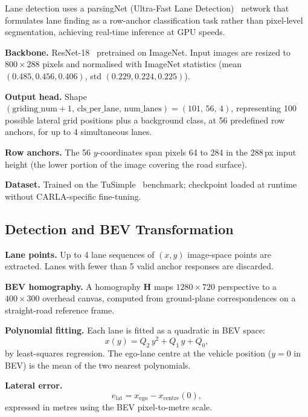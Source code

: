 \documentclass[12pt,a4paper]{article}
\begin{document}
Lane detection uses a parsingNet (Ultra-Fast Lane
Detection)~\cite{qin2020ufld} network that formulates lane finding as a
row-anchor classification task rather than pixel-level segmentation,
achieving real-time inference at GPU speeds.

\textbf{Backbone.}
ResNet-18~\cite{he2016resnet} pretrained on ImageNet.  Input images are
resized to $800\times288$ pixels and normalised with ImageNet statistics
(mean $(0.485,0.456,0.406)$, std $(0.229,0.224,0.225)$).

\textbf{Output head.}
Shape $(\text{griding\_num}+1,\,\text{cls\_per\_lane},\,\text{num\_lanes})
= (101,\,56,\,4)$, representing 100 possible lateral grid positions plus a
background class, at 56 predefined row anchors, for up to 4 simultaneous
lanes.

\textbf{Row anchors.}
The 56 $y$-coordinates span pixels 64 to 284 in the 288\,px input height
(the lower portion of the image covering the road surface).

\textbf{Dataset.}
Trained on the TuSimple~\cite{tusimple2017} benchmark; checkpoint loaded
at runtime without CARLA-specific fine-tuning.

\subsection{Detection and BEV Transformation}
\label{subsec:lane_bev}

\textbf{Lane points.}
Up to 4 lane sequences of $(x,y)$ image-space points are extracted.  Lanes
with fewer than 5 valid anchor responses are discarded.

\textbf{BEV homography.}
A homography $\mathbf{H}$ maps $1280\times720$ perspective to a
$400\times300$ overhead canvas, computed from ground-plane correspondences
on a straight-road reference frame.

\textbf{Polynomial fitting.}
Each lane is fitted as a quadratic in BEV space:
\begin{equation}
  x(y) = Q_2\,y^2 + Q_1\,y + Q_0,
  \label{eq:lane_poly}
\end{equation}
by least-squares regression.  The ego-lane centre at the vehicle position
($y=0$ in BEV) is the mean of the two nearest polynomials.

\textbf{Lateral error.}
\begin{equation}
  e_{\text{lat}} = x_{\text{ego}} - x_{\text{centre}}(0),
  \label{eq:lat_error}
\end{equation}
expressed in metres using the BEV pixel-to-metre scale.
\end{document}
